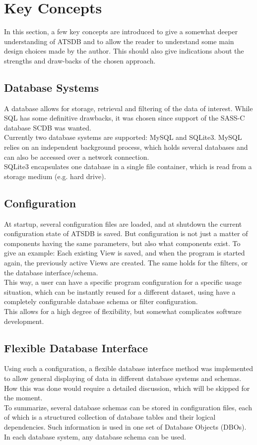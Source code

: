 \chapter{Key Concepts}
\label{sec:key_concepts}

In this section, a few key concepts are introduced to give a somewhat deeper understanding of ATSDB and to allow the reader to understand some main design choices made by the author. This should also give indications about the strengths and draw-backs of the chosen approach.

\section*{Database Systems}
A database allows for storage, retrieval and filtering of the data of interest. While SQL has some definitive drawbacks, it was chosen since support of the SASS-C database SCDB was wanted.\\
Currently  two  database  systems  are  supported:  MySQL  and  SQLite3.   MySQL  relies  on  an  independent background process, which holds several databases and can also be accessed over a network connection.\\
SQLite3 encapsulates one database in a single file container, which is read from a storage medium (e.g. hard drive).

\section*{Configuration}
At startup, several configuration files are loaded, and at shutdown the current configuration state of ATSDB is saved.  But configuration is not just a matter of components having the same parameters, but also what components exist. To give an example: Each existing View is saved, and when the program is started again, the previously active Views are created.  The same holds for the filters, or the database interface/schema. \\
This way, a user can have a specific program configuration for a specific usage situation, which can be instantly reused for a different dataset, using have a completely configurable database schema or filter configuration. \\
This allows for a high degree of flexibility, but somewhat complicates software development.

\section*{Flexible Database Interface}
Using such a configuration, a flexible database interface method was implemented to allow general displaying of data in different database systems and schemas.  How this was done would require a detailed discussion, which will be skipped for the moment.\\
To summarize, several database schemas can be stored in configuration files, each of which is a structured collection of database tables and their logical dependencies. Such information is used in one set of Database Objects (DBOs). In each database system, any database schema can be used.

